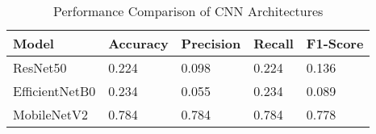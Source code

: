 \begin{table}[h]
\centering
\caption{Performance Comparison of CNN Architectures}
\label{tab:model_comparison}
\begin{tabular}{lllll}
\toprule
Model & Accuracy & Precision & Recall & F1-Score \\
\midrule
ResNet50 & 0.224 & 0.098 & 0.224 & 0.136 \\
EfficientNetB0 & 0.234 & 0.055 & 0.234 & 0.089 \\
MobileNetV2 & 0.784 & 0.784 & 0.784 & 0.778 \\
\bottomrule
\end{tabular}
\end{table}
